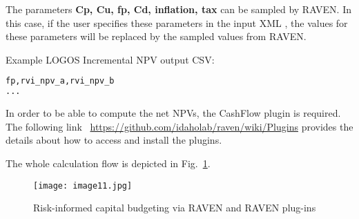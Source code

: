 The parameters \textbf{Cp, Cu, fp, Cd, inflation, tax} can be sampled by RAVEN. In
this case, if the user specifies these parameters in the input XML ,
the values for these parameters will be replaced by the sampled values from RAVEN.

Example LOGOS Incremental NPV output CSV:
\begin{lstlisting}[language=python]
fp,rvi_npv_a,rvi_npv_b
...
\end{lstlisting}

\nb In order to be able to compute the net NPVs, the CashFlow plugin is required.
The following link ~\url{https://github.com/idaholab/raven/wiki/Plugins} provides
the details about how to access and install the plugins.

The whole calculation flow is depicted in Fig.~\ref{fig:LogosRAVEN}.


\begin{figure}
    \centering
    \centerline{\texttt{[image: image11.jpg]}}
    \caption{Risk-informed capital budgeting via RAVEN and RAVEN plug-ins}
    \label{fig:LogosRAVEN}
\end{figure}

